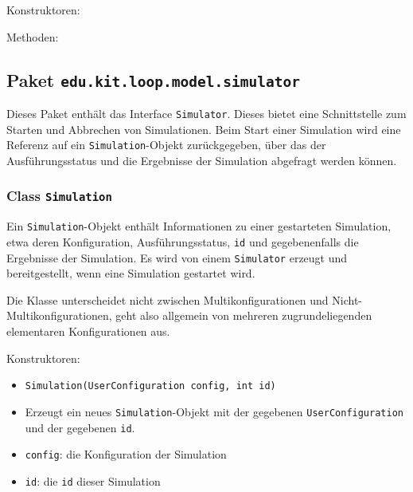 \documentclass[parskip=full,11pt]{scrartcl}
\begin{document}
Konstruktoren:

Methoden:

\subsection{Paket \texttt{edu.kit.loop.model.simulator}}
Dieses Paket enthält das Interface \texttt{Simulator}. Dieses bietet eine Schnittstelle zum Starten und Abbrechen von Simulationen. Beim Start einer Simulation wird eine Referenz auf ein \texttt{Simulation}-Objekt zurückgegeben, über das der Ausführungsstatus und die Ergebnisse der Simulation abgefragt werden können.

\subsubsection{Class \texttt{Simulation}}
Ein \texttt{Simulation}-Objekt enthält Informationen zu einer gestarteten Simulation, etwa deren Konfiguration, Ausführungsstatus, \texttt{id} und gegebenenfalls die Ergebnisse der Simulation. Es wird von einem \texttt{Simulator} erzeugt und bereitgestellt, wenn eine Simulation gestartet wird.

Die Klasse unterscheidet nicht zwischen Multikonfigurationen und Nicht-Multikonfigurationen, geht also allgemein von mehreren zugrundeliegenden elementaren Konfigurationen aus.

Konstruktoren:
\begin{itemize} \itemsep -10pt
\item \texttt{Simulation(UserConfiguration config, int id)}
\item[] Erzeugt ein neues \texttt{Simulation}-Objekt mit der gegebenen \texttt{UserConfiguration} und der gegebenen \texttt{id}.
\item[] \texttt{config}: die Konfiguration der Simulation
\item[] \texttt{id}: die \texttt{id} dieser Simulation
\end{itemize}
\end{document}
